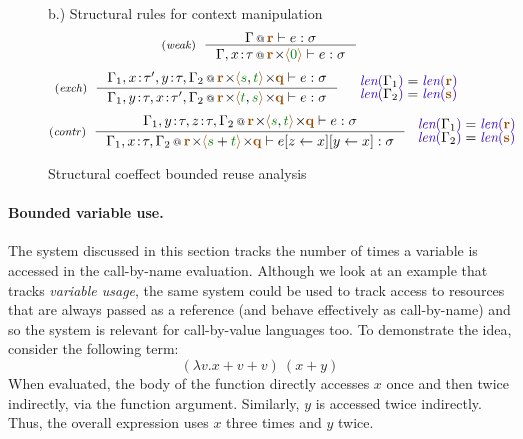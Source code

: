 \begin{figure}[t]
{\small b.) Structural rules for context manipulation}
\begin{equation*}
\tyrule{weak}
  {\coctx{\Gamma}{ \aclrd{\textbf{r}} } \vdash e : \sigma}
  {\coctx{\Gamma,x \!:\! \tau}{\aclrd{\textbf{r}} \cons \alift{ \cclrd{0} }} \vdash e : \sigma} 
\end{equation*}
\begin{equation*}
\tyrule{exch}
  {\coctx{\Gamma_1,x\!:\!\tau',y\!:\!\tau,\Gamma_2}{\aclrd{\textbf{r}} \cons\alift{\cclrd{s},\cclrd{t}} \cons \aclrd{\textbf{q}}} \vdash e : \sigma}
  {\coctx{\Gamma_1,y\!:\!\tau,x\!:\!\tau',\Gamma_2}{\aclrd{\textbf{r}} \cons\alift{\cclrd{t},\cclrd{s}} \cons \aclrd{\textbf{q}}} \vdash e : \sigma}
\quad
\begin{array}{l}
\slen{\Gamma_1} = \slen{\aclrd{\textbf{r}}}\\[-0.25em]
\slen{\Gamma_2} = \slen{\aclrd{\textbf{s}}}
\end{array}
\end{equation*}
\begin{equation*}
\tyrule{contr}
  {\coctx{\Gamma_1,y\!:\!\tau,z\!:\!\tau,\Gamma_2}{\aclrd{\textbf{r}} \cons \alift{\cclrd{s},\cclrd{t}} \cons \aclrd{\textbf{q}}} \vdash e : \sigma}
  {\coctx{\Gamma_1,x\!:\!\tau,\Gamma_2}{\aclrd{\textbf{r}} \cons \alift{\cclrd{s}+\cclrd{t}} \cons \aclrd{\textbf{q}}} \vdash \subst{\subst{e}{z}{x}}{y}{x} : \sigma}
~
\begin{array}{l}
\slen{\Gamma_1} = \slen{\aclrd{\textbf{r}}}\\[-0.25em]
\slen{\Gamma_2} = \slen{\aclrd{\textbf{s}}}
\end{array}
\end{equation*}

\caption{Structural coeffect bounded reuse analysis}
\label{fig:applications-struct-bll}
\vspace{-1em}
\end{figure}


\paragraph{Bounded variable use.} 
The system discussed in this section tracks the number of times a variable is accessed in the 
call-by-name evaluation. Although we look at an example that tracks \emph{variable usage}, the same
system could be used to track access to resources that are always passed as a reference (and behave
effectively as call-by-name) and so the system is relevant for call-by-value languages too.
To demonstrate the idea, consider the following term:
%
\begin{equation*}
(\lambda v.x + v + v)~(x+y)
\end{equation*}
%
When evaluated, the body of the function directly accesses $x$ once and then twice indirectly, via
the function argument. Similarly, $y$ is accessed twice indirectly. Thus, the overall expression uses
$x$ three times and $y$ twice.

